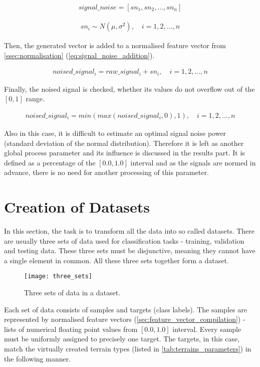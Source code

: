 \begin{align}
signal\_noise = [sn_1, sn_2, ..., sn_n]
\end{align}

\begin{align}
sn_i \sim N(\mu, \sigma^2), \quad i = 1, 2, ..., n
\end{align}

Then, the generated vector is added to a normalised feature vector from \cref{ssec:normalisation} (\cref{eq:signal_noise_addition}).

\begin{align} \label{eq:signal_noise_addition}
noised\_signal_i = raw\_signal_i + sn_i, \quad i = 1, 2, ..., n
\end{align}

Finally, the noised signal is checked, whether its values do not overflow out of the $ [0, 1] $ range.

\begin{align}
noised\_signal_i = min(max(noised\_signal_i , 0), 1), \quad i = 1, 2, ..., n
\end{align}

Also in this case, it is difficult to estimate an optimal signal noise power (standard deviation of the normal distribution). Therefore it is left as another global process parameter and its influence is discussed in the results part. It is defined as a percentage of the $ [0.0, 1.0] $ interval and as the signals are normed in advance, there is no need for another processing of this parameter.

\section{Creation of Datasets} \label{sec:dataset_creation}
In this section, the task is to transform all the data into so called datasets. There are usually three sets of data used for classification tasks - training, validation and testing data. These three sets must be disjunctive, meaning they cannot have a single element in common. All these three sets together form a dataset.

\begin{figure}[H]
  \centering
  \texttt{[image: three\_sets]}
  \caption{Three sets of data in a dataset.}
  \label{img:three_sets}
\end{figure}

Each set of data consists of samples and targets (class labels). The samples are represented by normalised feature vectors (\cref{sec:feature_vector_compilation}) - lists of numerical floating point values from $ [0.0, 1.0] $ interval. Every sample must be uniformly assigned to precisely one target. The targets, in this case, match the virtually created terrain types (listed in \cref{tab:terrains_parameters}) in the following manner.

